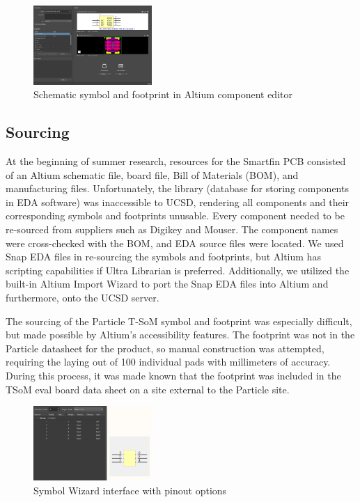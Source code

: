\documentclass[twocolumn]{article}
\begin{document}
\begin{figure}[h]
    \centering
    \includegraphics[width=0.4\textwidth]{component example.png}
    \caption{Schematic symbol and footprint in Altium component editor}
    \label{fig:component-editor}
\end{figure}

\subsection{Sourcing}
At the beginning of summer research, resources for the Smartfin PCB consisted of an Altium schematic file, board file, Bill of Materials (BOM), and manufacturing files. Unfortunately, the library (database for storing components in EDA software) was inaccessible to UCSD, rendering all components and their corresponding symbols and footprints unusable. Every component needed to be re-sourced from suppliers such as Digikey\cite{Digikey} and Mouser\cite{Mouser}. The component names were cross-checked with the BOM, and EDA source files were located. We used Snap EDA\cite{SnapEDA} files in re-sourcing the symbols and footprints, but Altium has scripting capabilities if Ultra Librarian\cite{UltraLibrarian} is preferred. Additionally, we utilized the built-in Altium Import Wizard to port the Snap EDA files into Altium and furthermore, onto the UCSD server. 

The sourcing of the Particle T-SoM symbol and footprint was especially difficult, but made possible by Altium’s accessibility features. The footprint was not in the Particle datasheet for the product, so manual construction was attempted, requiring the laying out of 100 individual pads with millimeters of accuracy. During this process, it was made known that the footprint was included in the TSoM eval board data sheet on a site external to the Particle site. 

\begin{figure}[h]
    \centering
    \includegraphics[width=0.4\textwidth]{symbol wizard.png}
    \caption{Symbol Wizard interface with pinout options}
    \label{fig:enter-label}
\end{figure}
\end{document}
